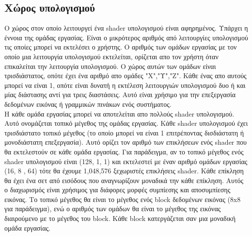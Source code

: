\subsection{Χώρος υπολογισμού}
Ο χώρος στον οποίο λειτουργεί ένα shader υπολογισμού είναι αφηρημένος. Υπάρχει η έννοια της ομάδας εργασίας. Είναι ο μικρότερος αριθμός από λειτουργίες υπολογισμού τις οποίες μπορεί να εκτελέσει ο χρήστης.
Ο αριθμός των ομάδων εργασίας με τον οποίο μια λειτουργία υπολογισμού εκτελείται, ορίζεται απο τον χρήστη όταν επικαλείται την λειτουργία υπολογισμού. Ο χώρος αυτών των ομάδων είναι τρισδιάστατος, οπότε έχει ένα αριθμό απο ομάδες "Χ","Υ","Ζ". Κάθε ένας απο αυτούς μπορεί να είναι 1, οπότε είναι δυνατή η εκτέλεση λειτουργιών υπολογισμού δυο ή και μίας διάστασης αντί για τρεις διαστάσεις. Αυτό είναι χρήσιμο για την επεξεργασία δεδομένων εικόνας ή γραμμικών πινάκων ενός συστήματος.\\
Η κάθε ομάδα εργασίας μπορεί να αποτελείται απο πολλούς shader υπολογισμού. Αυτό ονομάζεται τοπικό μέγεθος της ομάδας εργασίας. Κάθε shader υπολογισμού έχει τρισδιάστατο τοπικό μέγεθος (το οποίο μπορεί να είναι 1 επιτρέποντας δισδιάστατη ή μονοδιάστατη επεξεργασία). Αυτό ορίζει τον αριθμό των επικλήσεων ενός shader που θα εκτελεστούν σε κάθε ομάδα εργασίας. Για παράδειγμα, αν το τοπικό μέγεθος ενός shader υπολογισμού είναι (128, 1, 1) και εκτελεστεί με έναν αριθμό ομάδων εργασίας (16, 8 , 64) τότε θα έχουμε 1,048,576 ξεχωριστές επικλήσεις shader. Κάθε επίκληση θα έχει ένα σετ από εισόδους που αναγνωρίζουν μοναδικά την κάθε επίκληση. Αυτός ο διαχωρισμός είναι χρήσιμος για διάφορες μορφές συμπίεσης και αποσυμπίεσης εικόνας. Το τοπικό μέγεθος θα είναι το μέγεθος ενός block δεδομένων εικόνας (8x8 για παράδειγμα), ενώ ο αριθμός των ομάδων θα είναι το μέγεθος της εικόνας διαιρούμενο με το μέγεθος του block. Κάθε block κατεργάζεται σαν μια μοναδική ομάδα εργασίας.